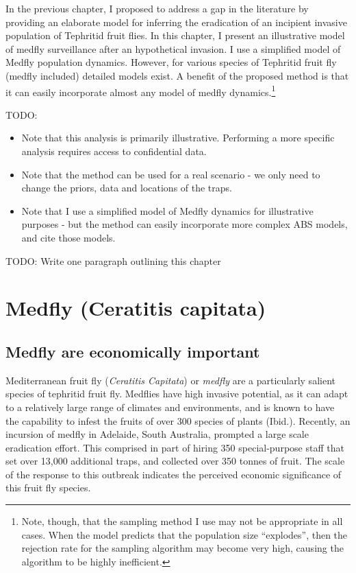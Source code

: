 \documentclass[
  oneside]{book}
\providecommand{\tightlist}{%
  \setlength{\itemsep}{0pt}\setlength{\parskip}{0pt}}
\begin{document}
In the previous chapter, I proposed to address a gap in the literature by providing an elaborate model for inferring the eradication of an incipient invasive population of Tephritid fruit flies. In this chapter, I present an illustrative model of medfly surveillance after an hypothetical invasion. I use a simplified model of Medfly population dynamics. However, for various species of Tephritid fruit fly (medfly included) detailed models exist. A benefit of the proposed method is that it can easily incorporate almost any model of medfly dynamics.\footnote{Note, though, that the sampling method I use may not be appropriate in all cases. When the model predicts that the population size ``explodes'', then the rejection rate for the sampling algorithm may become very high, causing the algorithm to be highly inefficient.}

TODO:

\begin{itemize}
\tightlist
\item
  Note that this analysis is primarily illustrative. Performing a more specific analysis requires access to confidential data.
\item
  Note that the method can be used for a real scenario - we only need to change the priors, data and locations of the traps.
\item
  Note that I use a simplified model of Medfly dynamics for illustrative purposes - but the method can easily incorporate more complex ABS models, and cite those models.
\end{itemize}

TODO: Write one paragraph outlining this chapter

\hypertarget{medfly-ceratitis-capitata}{%
\section{Medfly (Ceratitis capitata)}\label{medfly-ceratitis-capitata}}

\hypertarget{medfly-are-economically-important}{%
\subsection{Medfly are economically important}\label{medfly-are-economically-important}}

Mediterranean fruit fly (\emph{Ceratitis Capitata}) or \emph{medfly} are a particularly salient species of tephritid fruit fly. Medflies have high invasive potential, as it can adapt to a relatively large range of climates and environments, and is known to have the capability to infest the fruits of over 300 species of plants (Ibid.). Recently, an incursion of medfly in Adelaide, South Australia, prompted a large scale eradication effort. This comprised in part of hiring 350 special-purpose staff that set over 13,000 additional traps, and collected over 350 tonnes of fruit. The scale of the response to this outbreak indicates the perceived economic significance of this fruit fly species.
\end{document}

